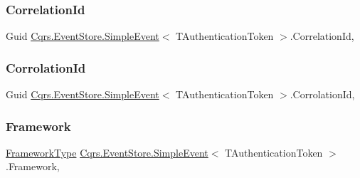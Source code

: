 \subsubsection{\texorpdfstring{Correlation\+Id}{CorrelationId}}
{\footnotesize\ttfamily Guid \hyperlink{classCqrs_1_1EventStore_1_1SimpleEvent}{Cqrs.\+Event\+Store.\+Simple\+Event}$<$ T\+Authentication\+Token $>$.Correlation\+Id\hspace{0.3cm}{\ttfamily [get]}, {\ttfamily [set]}}

\mbox{\label{classCqrs_1_1EventStore_1_1SimpleEvent_a1f0f55ac94ac408f10ad2fd8b3843ddf_a1f0f55ac94ac408f10ad2fd8b3843ddf}} 
\subsubsection{\texorpdfstring{Corrolation\+Id}{CorrolationId}}
{\footnotesize\ttfamily Guid \hyperlink{classCqrs_1_1EventStore_1_1SimpleEvent}{Cqrs.\+Event\+Store.\+Simple\+Event}$<$ T\+Authentication\+Token $>$.Corrolation\+Id\hspace{0.3cm}{\ttfamily [get]}, {\ttfamily [set]}}

\mbox{\label{classCqrs_1_1EventStore_1_1SimpleEvent_aaf8a01038e32c3f0c0edd53fbad3658c_aaf8a01038e32c3f0c0edd53fbad3658c}} 
\subsubsection{\texorpdfstring{Framework}{Framework}}
{\footnotesize\ttfamily \hyperlink{namespaceCqrs_1_1Messages_af06a7e6cd2609043d0f2f5f3419f81e3_af06a7e6cd2609043d0f2f5f3419f81e3}{Framework\+Type} \hyperlink{classCqrs_1_1EventStore_1_1SimpleEvent}{Cqrs.\+Event\+Store.\+Simple\+Event}$<$ T\+Authentication\+Token $>$.Framework\hspace{0.3cm}{\ttfamily [get]}, {\ttfamily [set]}}


